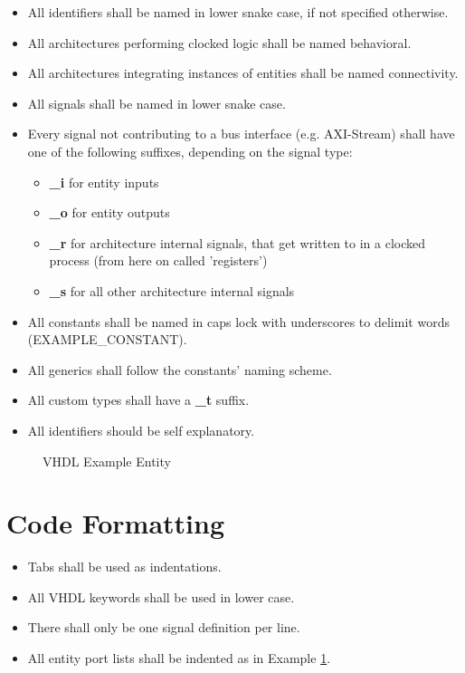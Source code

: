\begin{itemize}[parsep=1pt]
	\item All identifiers shall be named in lower snake case, if not specified otherwise.
	\item All architectures performing clocked logic shall be named behavioral.
	\item All architectures integrating instances of entities shall be named connectivity.
	\item All signals shall be named in lower snake case.
	\item Every signal not contributing to a bus interface (e.g. AXI-Stream) shall have one of the following suffixes, depending on the signal type: 
	\begin{itemize}
		\item \textbf{\_i} for entity inputs
		\item \textbf{\_o} for entity outputs
		\item \textbf{\_r} for architecture internal signals, that get written to in a clocked process (from here on called 'registers')
		\item \textbf{\_s} for all other architecture internal signals
	\end{itemize}
	\item All constants shall be named in caps lock with underscores to delimit words (EXAMPLE\_CONSTANT).
	\item All generics shall follow the constants' naming scheme.
	\item All custom types shall have a \textbf{\_t} suffix.
	\item All identifiers should be self explanatory.
\end{itemize}
\begin{figure}[hbt]
	
	\label{fig:naming}
	\caption{VHDL Example Entity}
\end{figure}

\section{Code Formatting}

\begin{itemize}[parsep=1pt]
	\item Tabs shall be used as indentations.
	\item All VHDL keywords shall be used in lower case.
	\item There shall only be one signal definition per line.
	\item All entity port lists shall be indented as in Example \ref{fig:naming}.
\end{itemize}

